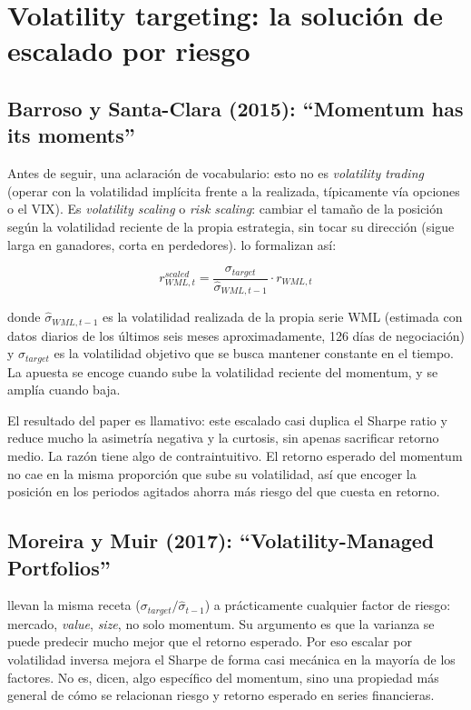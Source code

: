 \documentclass[12pt]{report} %
\begin{document}
\section{Volatility targeting: la solución de escalado por riesgo}

\subsection{Barroso y Santa-Clara (2015): ``Momentum has its moments''}

Antes de seguir, una aclaración de vocabulario: esto no es \textit{volatility trading} (operar con la volatilidad implícita frente a la realizada, típicamente vía opciones o el VIX). Es \textit{volatility scaling} o \textit{risk scaling}: cambiar el tamaño de la posición según la volatilidad reciente de la propia estrategia, sin tocar su dirección (sigue larga en ganadores, corta en perdedores). \citet{barroso2015} lo formalizan así:

\begin{equation}
	r^{scaled}_{WML,t} = \frac{\sigma_{target}}{\hat{\sigma}_{WML,t-1}} \cdot r_{WML,t}
\end{equation}

donde $\hat{\sigma}_{WML,t-1}$ es la volatilidad realizada de la propia serie WML (estimada con datos diarios de los últimos seis meses aproximadamente, 126 días de negociación) y $\sigma_{target}$ es la volatilidad objetivo que se busca mantener constante en el tiempo. La apuesta se encoge cuando sube la volatilidad reciente del momentum, y se amplía cuando baja.

El resultado del paper es llamativo: este escalado casi duplica el Sharpe ratio y reduce mucho la asimetría negativa y la curtosis, sin apenas sacrificar retorno medio. La razón tiene algo de contraintuitivo. El retorno esperado del momentum no cae en la misma proporción que sube su volatilidad, así que encoger la posición en los periodos agitados ahorra más riesgo del que cuesta en retorno.

\subsection{Moreira y Muir (2017): ``Volatility-Managed Portfolios''}

\citet{moreiramuir2017} llevan la misma receta ($\sigma_{target}/\hat{\sigma}_{t-1}$) a prácticamente cualquier factor de riesgo: mercado, \textit{value}, \textit{size}, no solo momentum. Su argumento es que la varianza se puede predecir mucho mejor que el retorno esperado. Por eso escalar por volatilidad inversa mejora el Sharpe de forma casi mecánica en la mayoría de los factores. No es, dicen, algo específico del momentum, sino una propiedad más general de cómo se relacionan riesgo y retorno esperado en series financieras.
\end{document}
